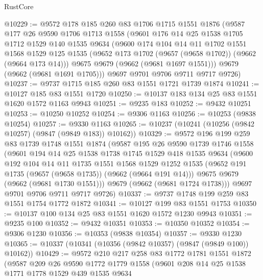 \begin{lexlean}{RustCore}
\begin{coremodule}
@10229 := @9572
    @178
    @185
    @260
    @83
    @1706
    @1715
    @1551
    @1876
    (@9587
      @177
      @26
      @9590
      @1706
      @1713
      @1558
      (@9601
        @176
        @14
        @25
        @1538
        @1705
        @1712
        @1529
        @140
        @1535
        @9634
        (@9600
          @174
          @104
          @14
          @11
          @1702
          @1551
          @1568
          @1529
          @125
          @1535
          (@9652 @173 @1702 (@9657 (@9658 @1702)) (@9662 (@9664 @173 @14)))
          @9675
          @9679
          (@9662 (@9681 @1697 @1551)))
        @9679
        (@9662 (@9681 @1691 @1705)))
      @9697
      @9701
      @9706
      @9711
      @9717
      @9726)
@10237 := @9737 @1715 @185 @260 @83 @1551 @1721 @1739 @1874
@10241 := @10127 @185 @83 @1551 @1720
@10250 := @10137 @183 @134 @25 @83 @1551 @1620 @1572 @1163 @9943
@10251 := @9235 @183
@10252 := @9432 @10251
@10253 := @10250 @10252
@10254 := @9306 @1163
@10256 := @10253 (@9838 @10254)
@10257 := @9330 @1163
@10265 := @10237 (@10241 (@10256 (@9842 @10257) (@9847 (@9849 @183)) @10162))
@10329 := @9572
    @196
    @199
    @259
    @83
    @1739
    @1748
    @1551
    @1874
    (@9587
      @195
      @26
      @9590
      @1739
      @1746
      @1558
      (@9601
        @194
        @14
        @25
        @1538
        @1738
        @1745
        @1529
        @418
        @1535
        @9634
        (@9600
          @192
          @104
          @14
          @11
          @1735
          @1551
          @1568
          @1529
          @1252
          @1535
          (@9652 @191 @1735 (@9657 (@9658 @1735)) (@9662 (@9664 @191 @14)))
          @9675
          @9679
          (@9662 (@9681 @1730 @1551)))
        @9679
        (@9662 (@9681 @1724 @1738)))
      @9697
      @9701
      @9706
      @9711
      @9717
      @9726)
@10337 := @9737 @1748 @199 @259 @83 @1551 @1754 @1772 @1872
@10341 := @10127 @199 @83 @1551 @1753
@10350 := @10137 @100 @134 @25 @83 @1551 @1620 @1572 @1230 @9943
@10351 := @9235 @100
@10352 := @9432 @10351
@10353 := @10350 @10352
@10354 := @9306 @1230
@10356 := @10353 (@9838 @10354)
@10357 := @9330 @1230
@10365 := @10337 (@10341 (@10356 (@9842 @10357) (@9847 (@9849 @100)) @10162))
@10429 := @9572
    @210
    @217
    @258
    @83
    @1772
    @1781
    @1551
    @1872
    (@9587
      @209
      @26
      @9590
      @1772
      @1779
      @1558
      (@9601
        @208
        @14
        @25
        @1538
        @1771
        @1778
        @1529
        @439
        @1535
        @9634

\end{coremodule}
\end{lexlean}
